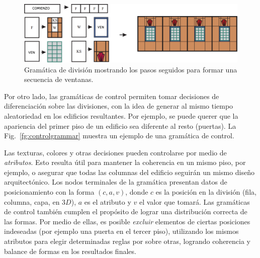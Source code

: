 \begin{figure}
\center
\includegraphics[width=13cm]{figures/splitgrammar}
\caption{Gramática de división mostrando los pasos seguidos para formar una secuencia de ventanas.}
\label{fg:splitgrammar}
\end{figure}

Por otro lado, las gramáticas de control permiten tomar decisiones de diferenciación sobre las divisiones, con la idea de generar al mismo tiempo aleatoriedad en los edificios resultantes.
Por ejemplo, se puede querer que la apariencia del primer piso de un edificio sea diferente al resto (puertas).
La Fig.~\ref{fg:controlgrammar} muestra un ejemplo de una gramática de control.

Las texturas, colores y otras decisiones pueden controlarse por medio de {\em atributos}.
Esto resulta útil para mantener la coherencia en un mismo piso, por ejemplo, o asegurar que todas las columnas del edificio seguirán un mismo diseño arquitectónico.
Los nodos terminales de la gramática presentan datos de posicionamiento con la forma $(c,a,v)$, donde $c$ es la posición en la división (fila, columna, capa, en $3D$), $a$ es el atributo y $v$ el valor que tomará.
Las gramáticas de control también cumplen el propósito de lograr una distribución correcta de las formas.
Por medio de ellas, es posible {\em excluir} elementos de ciertas posiciones indeseadas (por ejemplo una puerta en el tercer piso), utilizando los mismos atributos para elegir determinadas reglas por sobre otras, logrando coherencia y balance de formas en los resultados finales.

